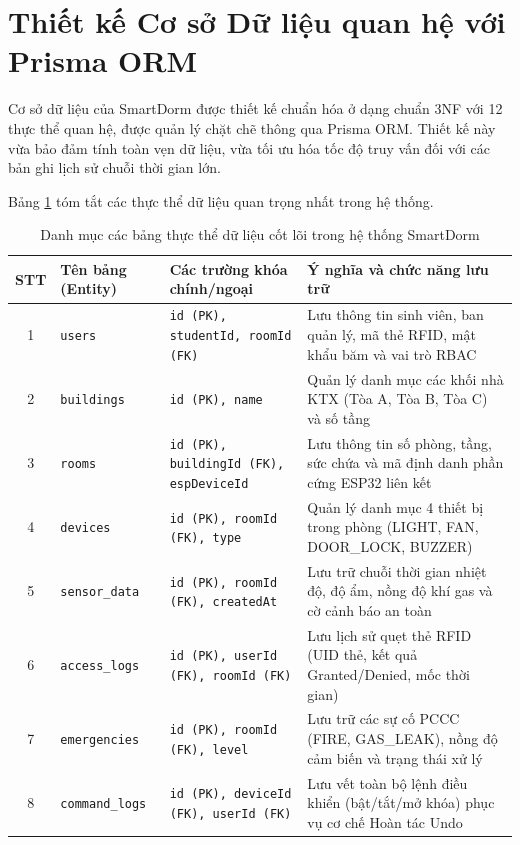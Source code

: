 \section{Thiết kế Cơ sở Dữ liệu quan hệ với Prisma ORM}
\label{sec:thiet_ke_csdl}

Cơ sở dữ liệu của SmartDorm được thiết kế chuẩn hóa ở dạng chuẩn 3NF với 12 thực thể quan hệ, được quản lý chặt chẽ thông qua Prisma ORM. Thiết kế này vừa bảo đảm tính toàn vẹn dữ liệu, vừa tối ưu hóa tốc độ truy vấn đối với các bản ghi lịch sử chuỗi thời gian lớn.

Bảng \ref{tab:thuc_the_csdl} tóm tắt các thực thể dữ liệu quan trọng nhất trong hệ thống.

\begin{table}[H]
\centering
\small
\begin{tabularx}{\textwidth}{|c|p{2.6cm}|p{4.0cm}|X|}
\hline
\textbf{STT} & \textbf{Tên bảng (Entity)} & \textbf{Các trường khóa chính/ngoại} & \textbf{Ý nghĩa và chức năng lưu trữ} \\
\hline
1 & \texttt{users} & \texttt{id (PK), studentId, roomId (FK)} & Lưu thông tin sinh viên, ban quản lý, mã thẻ RFID, mật khẩu băm và vai trò RBAC \\
\hline
2 & \texttt{buildings} & \texttt{id (PK), name} & Quản lý danh mục các khối nhà KTX (Tòa A, Tòa B, Tòa C) và số tầng \\
\hline
3 & \texttt{rooms} & \texttt{id (PK), buildingId (FK), espDeviceId} & Lưu thông tin số phòng, tầng, sức chứa và mã định danh phần cứng ESP32 liên kết \\
\hline
4 & \texttt{devices} & \texttt{id (PK), roomId (FK), type} & Quản lý danh mục 4 thiết bị trong phòng (LIGHT, FAN, DOOR\_LOCK, BUZZER) \\
\hline
5 & \texttt{sensor\_data} & \texttt{id (PK), roomId (FK), createdAt} & Lưu trữ chuỗi thời gian nhiệt độ, độ ẩm, nồng độ khí gas và cờ cảnh báo an toàn \\
\hline
6 & \texttt{access\_logs} & \texttt{id (PK), userId (FK), roomId (FK)} & Lưu lịch sử quẹt thẻ RFID (UID thẻ, kết quả Granted/Denied, mốc thời gian) \\
\hline
7 & \texttt{emergencies} & \texttt{id (PK), roomId (FK), level} & Lưu trữ các sự cố PCCC (FIRE, GAS\_LEAK), nồng độ cảm biến và trạng thái xử lý \\
\hline
8 & \texttt{command\_logs} & \texttt{id (PK), deviceId (FK), userId (FK)} & Lưu vết toàn bộ lệnh điều khiển (bật/tắt/mở khóa) phục vụ cơ chế Hoàn tác Undo \\
\hline
\end{tabularx}
\caption{Danh mục các bảng thực thể dữ liệu cốt lõi trong hệ thống SmartDorm}
\label{tab:thuc_the_csdl}
\end{table}

